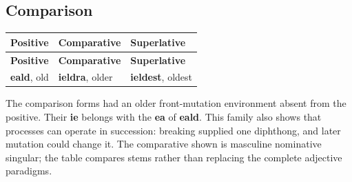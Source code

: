 \subsection*{Comparison}
\begingroup
\fontsize{10.5}{13.2}\selectfont
\setlength{\LTleft}{0pt}
\setlength{\LTright}{0pt plus 1fil}
\begin{longtable}{@{}>{\raggedright\arraybackslash}p{}>{\raggedright\arraybackslash}p{}>{\raggedright\arraybackslash}p{}@{}}
\toprule
\textbf{Positive} & \textbf{Comparative} & \textbf{Superlative} \\
\midrule
\endfirsthead
\toprule
\textbf{Positive} & \textbf{Comparative} & \textbf{Superlative} \\
\midrule
\endhead
\bottomrule
\endfoot
\bottomrule
\endlastfoot
\textbf{eald}, old & \textbf{ieldra}, older & \textbf{ieldest}, oldest \\
\end{longtable}
\endgroup
The comparison forms had an older front-mutation environment absent from the positive. Their \textbf{ie} belongs with the \textbf{ea} of \textbf{eald}. This family also shows that processes can operate in succession: breaking supplied one diphthong, and later mutation could change it. The comparative shown is masculine nominative singular; the table compares stems rather than replacing the complete adjective paradigms.\par
